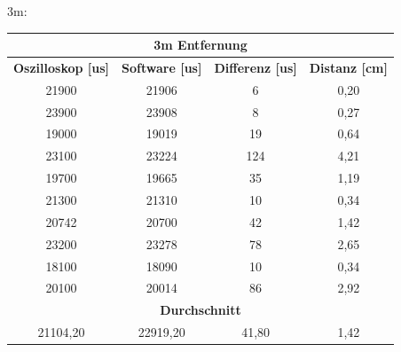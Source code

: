 3m:
\begin{table}[H]
\begin{tabular}{|c|c|c|c|}
\hline
\multicolumn{4}{|c|}{\textbf{3m Entfernung}}                                                                         \\ \hline
\textbf{Oszilloskop {[}us{]}} & \textbf{Software {[}us{]}} & \textbf{Differenz {[}us{]}} & \textbf{Distanz {[}cm{]}} \\ \hline
21900                         & 21906                      & 6                           & 0,20                      \\ \hline
23900                         & 23908                      & 8                           & 0,27                      \\ \hline
19000                         & 19019                      & 19                          & 0,64                      \\ \hline
23100                         & 23224                      & 124                         & 4,21                      \\ \hline
19700                         & 19665                      & 35                          & 1,19                      \\ \hline
21300                         & 21310                      & 10                          & 0,34                      \\ \hline
20742                         & 20700                      & 42                          & 1,42                      \\ \hline
23200                         & 23278                      & 78                          & 2,65                      \\ \hline
18100                         & 18090                      & 10                          & 0,34                      \\ \hline
20100                         & 20014                      & 86                          & 2,92                      \\ \hline
\multicolumn{4}{|c|}{\textbf{Durchschnitt}}                                                                          \\ \hline
21104,20                      & 22919,20                   & 41,80                       & 1,42                      \\ \hline
\end{tabular}
\end{table}



